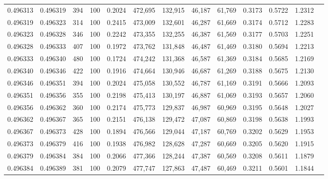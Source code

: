 \begin{tabular}{rrrrrrrrrrrrr}
0.496313 & 0.496319 &   394 & 100 &                                     0.2024 & 472,695 & 132,915 &  46,187 &  61,769 & 0.3173 & 0.5722 & 1.2312 \\
0.496319 & 0.496323 &   314 & 100 &                                     0.2415 & 473,009 & 132,601 &  46,287 &  61,669 & 0.3174 & 0.5712 & 1.2283 \\
0.496323 & 0.496328 &   346 & 100 &                                     0.2242 & 473,355 & 132,255 &  46,387 &  61,569 & 0.3177 & 0.5703 & 1.2251 \\
0.496328 & 0.496333 &   407 & 100 &                                     0.1972 & 473,762 & 131,848 &  46,487 &  61,469 & 0.3180 & 0.5694 & 1.2213 \\
0.496333 & 0.496340 &   480 & 100 &                                     0.1724 & 474,242 & 131,368 &  46,587 &  61,369 & 0.3184 & 0.5685 & 1.2169 \\
0.496340 & 0.496346 &   422 & 100 &                                     0.1916 & 474,664 & 130,946 &  46,687 &  61,269 & 0.3188 & 0.5675 & 1.2130 \\
0.496346 & 0.496351 &   394 & 100 &                                     0.2024 & 475,058 & 130,552 &  46,787 &  61,169 & 0.3191 & 0.5666 & 1.2093 \\
0.496351 & 0.496356 &   355 & 100 &                                     0.2198 & 475,413 & 130,197 &  46,887 &  61,069 & 0.3193 & 0.5657 & 1.2060 \\
0.496356 & 0.496362 &   360 & 100 &                                     0.2174 & 475,773 & 129,837 &  46,987 &  60,969 & 0.3195 & 0.5648 & 1.2027 \\
0.496362 & 0.496367 &   365 & 100 &                                     0.2151 & 476,138 & 129,472 &  47,087 &  60,869 & 0.3198 & 0.5638 & 1.1993 \\
0.496367 & 0.496373 &   428 & 100 &                                     0.1894 & 476,566 & 129,044 &  47,187 &  60,769 & 0.3202 & 0.5629 & 1.1953 \\
0.496373 & 0.496379 &   416 & 100 &                                     0.1938 & 476,982 & 128,628 &  47,287 &  60,669 & 0.3205 & 0.5620 & 1.1915 \\
0.496379 & 0.496384 &   384 & 100 &                                     0.2066 & 477,366 & 128,244 &  47,387 &  60,569 & 0.3208 & 0.5611 & 1.1879 \\
0.496384 & 0.496389 &   381 & 100 &                                     0.2079 & 477,747 & 127,863 &  47,487 &  60,469 & 0.3211 & 0.5601 & 1.1844 \\

\end{tabular}
